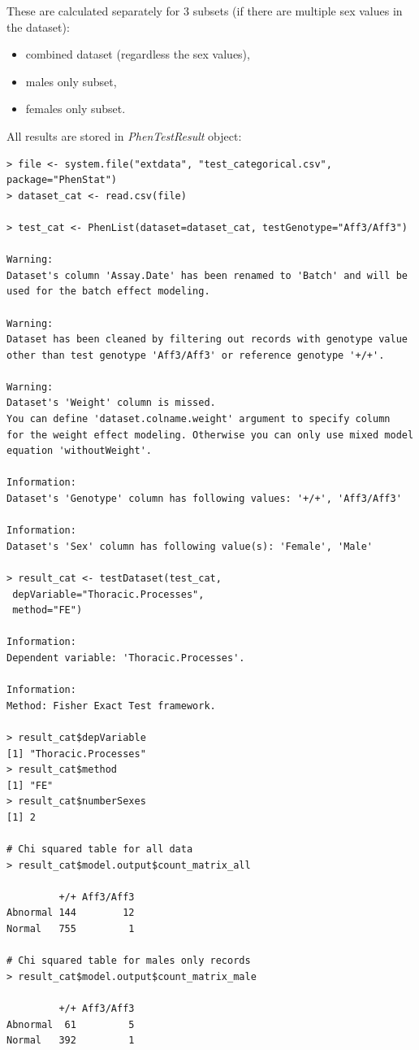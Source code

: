 \documentclass[12pt,a4paper]{article}
\begin{document}
These are calculated separately for 3 subsets (if there are multiple sex values in the dataset):
\begin{itemize}
 \item combined dataset (regardless the sex values),
 \item males only subset,
 \item females only subset.
\end{itemize}

All results are stored in \textit{PhenTestResult} object:

\begingroup
\fontsize{8pt}{12pt}\selectfont
\begin{verbatim}
> file <- system.file("extdata", "test_categorical.csv", package="PhenStat") 
> dataset_cat <- read.csv(file)

> test_cat <- PhenList(dataset=dataset_cat, testGenotype="Aff3/Aff3")
 
Warning:
Dataset's column 'Assay.Date' has been renamed to 'Batch' and will be used for the batch effect modeling.

Warning:
Dataset has been cleaned by filtering out records with genotype value 
other than test genotype 'Aff3/Aff3' or reference genotype '+/+'.

Warning:
Dataset's 'Weight' column is missed.
You can define 'dataset.colname.weight' argument to specify column 
for the weight effect modeling. Otherwise you can only use mixed model equation 'withoutWeight'.

Information:
Dataset's 'Genotype' column has following values: '+/+', 'Aff3/Aff3'

Information:
Dataset's 'Sex' column has following value(s): 'Female', 'Male'

> result_cat <- testDataset(test_cat,
 depVariable="Thoracic.Processes",
 method="FE")

Information:
Dependent variable: 'Thoracic.Processes'.

Information:
Method: Fisher Exact Test framework.

> result_cat$depVariable
[1] "Thoracic.Processes"
> result_cat$method
[1] "FE"
> result_cat$numberSexes
[1] 2

# Chi squared table for all data
> result_cat$model.output$count_matrix_all

         +/+ Aff3/Aff3
Abnormal 144        12
Normal   755         1

# Chi squared table for males only records
> result_cat$model.output$count_matrix_male

         +/+ Aff3/Aff3
Abnormal  61         5
Normal   392         1


\end{verbatim}
\end{document}
